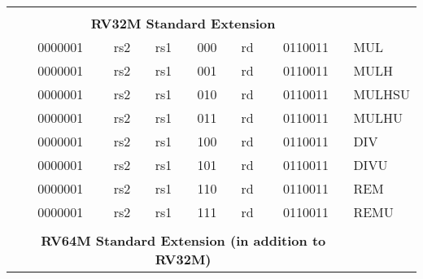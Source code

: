\begin{table}[p]
\begin{small}
\begin{center}
\begin{tabular}{p{0in}p{0.4in}p{0.05in}p{0.05in}p{0.05in}p{0.05in}p{0.4in}p{0.6in}p{0.4in}p{0.6in}p{0.7in}l}
&
\multicolumn{10}{c}{} & \\
&
\multicolumn{10}{c}{\bf RV32M Standard Extension} & \\
\cline{2-11}
  

&
\multicolumn{4}{|c|}{0000001} &
\multicolumn{2}{c|}{rs2} &
\multicolumn{1}{c|}{rs1} &
\multicolumn{1}{c|}{000} &
\multicolumn{1}{c|}{rd} &
\multicolumn{1}{c|}{0110011} & MUL \\
\cline{2-11}
  

&
\multicolumn{4}{|c|}{0000001} &
\multicolumn{2}{c|}{rs2} &
\multicolumn{1}{c|}{rs1} &
\multicolumn{1}{c|}{001} &
\multicolumn{1}{c|}{rd} &
\multicolumn{1}{c|}{0110011} & MULH \\
\cline{2-11}
  

&
\multicolumn{4}{|c|}{0000001} &
\multicolumn{2}{c|}{rs2} &
\multicolumn{1}{c|}{rs1} &
\multicolumn{1}{c|}{010} &
\multicolumn{1}{c|}{rd} &
\multicolumn{1}{c|}{0110011} & MULHSU \\
\cline{2-11}
  

&
\multicolumn{4}{|c|}{0000001} &
\multicolumn{2}{c|}{rs2} &
\multicolumn{1}{c|}{rs1} &
\multicolumn{1}{c|}{011} &
\multicolumn{1}{c|}{rd} &
\multicolumn{1}{c|}{0110011} & MULHU \\
\cline{2-11}
  

&
\multicolumn{4}{|c|}{0000001} &
\multicolumn{2}{c|}{rs2} &
\multicolumn{1}{c|}{rs1} &
\multicolumn{1}{c|}{100} &
\multicolumn{1}{c|}{rd} &
\multicolumn{1}{c|}{0110011} & DIV \\
\cline{2-11}
  

&
\multicolumn{4}{|c|}{0000001} &
\multicolumn{2}{c|}{rs2} &
\multicolumn{1}{c|}{rs1} &
\multicolumn{1}{c|}{101} &
\multicolumn{1}{c|}{rd} &
\multicolumn{1}{c|}{0110011} & DIVU \\
\cline{2-11}
  

&
\multicolumn{4}{|c|}{0000001} &
\multicolumn{2}{c|}{rs2} &
\multicolumn{1}{c|}{rs1} &
\multicolumn{1}{c|}{110} &
\multicolumn{1}{c|}{rd} &
\multicolumn{1}{c|}{0110011} & REM \\
\cline{2-11}
  

&
\multicolumn{4}{|c|}{0000001} &
\multicolumn{2}{c|}{rs2} &
\multicolumn{1}{c|}{rs1} &
\multicolumn{1}{c|}{111} &
\multicolumn{1}{c|}{rd} &
\multicolumn{1}{c|}{0110011} & REMU \\
\cline{2-11}
  

&
\multicolumn{10}{c}{} & \\
&
\multicolumn{10}{c}{\bf RV64M Standard Extension (in addition to RV32M)} & \\
\cline{2-11}
  


\end{tabular}
\end{center}
\end{small}
\end{table}

